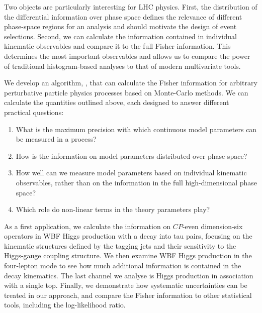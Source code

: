 Two objects are particularly interesting for LHC physics.  First, the
distribution of the differential information over phase space defines
the relevance of different phase-space regions for an analysis and
should motivate the design of event selections. Second, we can
calculate the information contained in individual kinematic
observables and compare it to the full Fisher information. This
determines the most important observables and allows us to compare the
power of traditional histogram-based analyses to that of modern
multivariate tools.

We develop an algorithm, , that can calculate the
Fisher information for arbitrary perturbative particle physics
processes based on Monte-Carlo methods. We can calculate the
quantities outlined above, each designed to answer different practical
questions:
%
\begin{enumerate}
\item What is the maximum precision
  with which continuous model parameters can be measured in a process?
\item How is the information
  on model parameters distributed over phase space?
\item How well can we measure model parameters based on individual
  kinematic observables, rather than on the information in the full
  high-dimensional phase space?
\item Which role do non-linear terms in the
  theory parameters play?
\end{enumerate}

\newparagraph
%
As a first application, we calculate the information on $CP$-even
dimension-six operators in WBF Higgs production with a decay into tau
pairs, focusing on the kinematic structures defined by the tagging
jets and their sensitivity to the Higgs-gauge coupling structure. We
then examine WBF Higgs production in the four-lepton mode to see how
much additional information is contained in the decay kinematics. The
last channel we analyse is Higgs production in association with a
single top.
%
%
Finally, we demonstrate how systematic uncertainties can be
treated in our approach, and compare the Fisher information to other
statistical tools, including the log-likelihood ratio.

